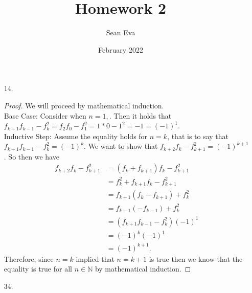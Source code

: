 \documentclass[11pt]{article}
\title{Homework 2}
\author{Sean Eva}
\date{February 2022}
\theoremstyle{definition}
\newcommand{\N}{\mathbb{N}}
\begin{document}
\maketitle

\begin{enumerate}
    \item [14. ]
    
    \begin{proof}
    We will proceed by mathematical induction.\\
    Base Case: Consider when $n=1,$. Then it holds that $f_{k+1}f_{k-1}-f_k^2 = f_2f_0-f_1^2 = 1*0-1^2 = -1 = (-1)^1$.\\
    Inductive Step: Assume the equality holds for $n=k$, that is to say that $f_{k+1}f_{k-1}-f_k^2 = (-1)^k.$ We want to show that $f_{k+2}f_{k}-f_{k+1}^2 = (-1)^{k+1}$. So then we have
    \begin{align*}
        f_{k+2}f_k-f_{k+1}^2 &= (f_{k}+f_{k+1})f_k -f_{k+1}^2\\
        &= f_k^2 + f_{k+1}f_k-f_{k+1}^2\\
        &= f_{k+1}(f_k-f_{k+1})+f_k^2\\
        &= f_{k+1}(-f_{k-1}) + f_k^2\\
        &= (f_{k+1}f_{k-1}-f_k^2)(-1)^1\\
        &= (-1)^k(-1)^1\\
        &= (-1)^{k+1}.
    \end{align*} Therefore, since $n=k$ implied that $n=k+1$ is true then we know that the equality is true for all $n\in \N$ by mathematical induction.
    \end{proof}
    
    \newpage
    \item [34. ]
    

\end{enumerate}
\end{document}
